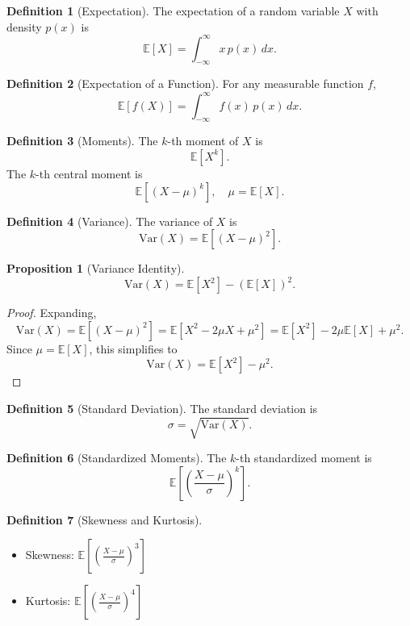 \documentclass[12pt,oneside]{book}
\numberwithin{equation}{section}
\theoremstyle{definition}
\newtheorem{definition}{Definition}[section]
\theoremstyle{plain}
\newtheorem{proposition}{Proposition}[section]
\theoremstyle{remark}
\newcommand{\E}{\mathbb{E}}
\newcommand{\Var}{\mathrm{Var}}
\begin{document}
\begin{definition}[Expectation]
The expectation of a random variable $X$ with density $p(x)$ is
\[
\E[X] = \int_{-\infty}^{\infty} x\,p(x)\,dx.
\]
\end{definition}

\begin{definition}[Expectation of a Function]
For any measurable function $f$,
\[
\E[f(X)] = \int_{-\infty}^{\infty} f(x)\,p(x)\,dx.
\]
\end{definition}

\begin{definition}[Moments]
The $k$-th moment of $X$ is
\[
\E[X^k].
\]
The $k$-th central moment is
\[
\E[(X - \mu)^k], \quad \mu = \E[X].
\]
\end{definition}

\begin{definition}[Variance]
The variance of $X$ is
\[
\Var(X) = \E[(X - \mu)^2].
\]
\end{definition}

\begin{proposition}[Variance Identity]
\[
\Var(X) = \E[X^2] - (\E[X])^2.
\]
\end{proposition}

\begin{proof}
Expanding,
\[
\Var(X) = \E[(X - \mu)^2] = \E[X^2 - 2\mu X + \mu^2]
= \E[X^2] - 2\mu \E[X] + \mu^2.
\]
Since $\mu = \E[X]$, this simplifies to
\[
\Var(X) = \E[X^2] - \mu^2.
\]
\end{proof}

\begin{definition}[Standard Deviation]
The standard deviation is
\[
\sigma = \sqrt{\Var(X)}.
\]
\end{definition}

\begin{definition}[Standardized Moments]
The $k$-th standardized moment is
\[
\E\left[\left(\frac{X - \mu}{\sigma}\right)^k\right].
\]
\end{definition}

\begin{definition}[Skewness and Kurtosis]
\begin{itemize}
    \item Skewness: $\E\left[\left(\frac{X - \mu}{\sigma}\right)^3\right]$
    \item Kurtosis: $\E\left[\left(\frac{X - \mu}{\sigma}\right)^4\right]$
\end{itemize}
\end{definition}
\end{document}

